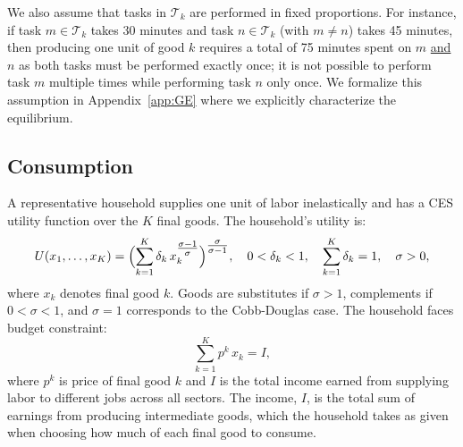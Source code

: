 \documentclass{article}
\theoremstyle{plain}
\theoremstyle{plain}
\begin{document}
We also assume that tasks in $\mathcal{T}_k\!$ are performed in fixed proportions.
For instance, if task $m \in \mathcal{T}_k$ takes 30 minutes and task $n \in \mathcal{T}_k$ (with $m \neq n$) takes 45 minutes, then producing one unit of good $k$ requires a total of 75 minutes spent on $m$ \underline{and} $n$ as both tasks must be performed exactly once; it is not possible to perform task $m$ multiple times while performing task $n$ only once.
We formalize this assumption in Appendix~\ref{app:GE} where we explicitly characterize the equilibrium.


\subsection{Consumption} 
\label{sec:household_GE}
A representative household supplies one unit of labor inelastically and has a CES utility function over the $K$ final goods.
The household's utility is:
\[
U(x_{1}, \ldots, x_{K}) = \Bigl(\sum_{k=1}^{K} \delta_k \,x_k^{\tfrac{\sigma - 1}{\sigma}}\Bigr)^{\tfrac{\sigma}{\sigma-1}},
\quad
0 < \delta_k < 1,
\quad
\sum_{k=1}^{K} \delta_k = 1,
\quad
\sigma > 0,
\]  
where $x_k$ denotes final good $k$.
Goods are substitutes if $ \sigma > 1$, complements if $0 < \sigma < 1$, and $\sigma = 1$ corresponds to the Cobb-Douglas case.  
The household faces budget constraint:  
\[
\sum_{k=1}^K p^k \,x_k = I,
\]  
where $p^k$ is price of final good $k$ and $I$ is the total income earned from supplying labor to different jobs across all sectors.  
The income, $I$, is the total sum of earnings from producing intermediate goods, which the household takes as given when choosing how much of each final good to consume.
\end{document}
